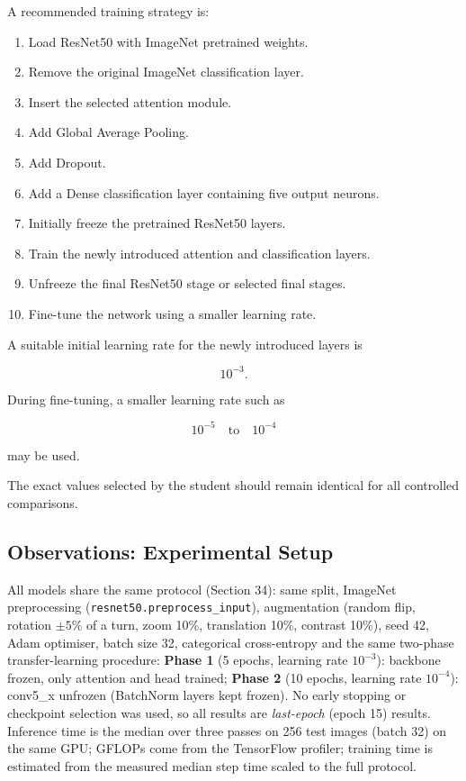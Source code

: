 \documentclass[10pt]{article}
\begin{document}
A recommended training strategy is:

\begin{enumerate}

\item Load ResNet50 with ImageNet pretrained weights.

\item Remove the original ImageNet classification layer.

\item Insert the selected attention module.

\item Add Global Average Pooling.

\item Add Dropout.

\item Add a Dense classification layer containing five output neurons.

\item Initially freeze the pretrained ResNet50 layers.

\item Train the newly introduced attention and classification layers.

\item Unfreeze the final ResNet50 stage or selected final stages.

\item Fine-tune the network using a smaller learning rate.

\end{enumerate}

A suitable initial learning rate for the newly introduced layers is

\[
10^{-3}.
\]

During fine-tuning, a smaller learning rate such as

\[
10^{-5}
\quad\text{to}\quad
10^{-4}
\]

may be used.

The exact values selected by the student should remain identical for all
controlled comparisons.


\subsection*{Observations: Experimental Setup}
All models share the same protocol (Section 34): same split, ImageNet preprocessing (\texttt{resnet50.preprocess\_input}), augmentation (random flip, rotation $\pm5\%$ of a turn, zoom 10\%, translation 10\%, contrast 10\%), seed 42, Adam optimiser, batch size 32, categorical cross-entropy and the same two-phase transfer-learning procedure: \textbf{Phase 1} (5 epochs, learning rate $10^{-3}$): backbone frozen, only attention and head trained; \textbf{Phase 2} (10 epochs, learning rate $10^{-4}$): conv5\_x unfrozen (BatchNorm layers kept frozen). No early stopping or checkpoint selection was used, so all results are \emph{last-epoch} (epoch 15) results. Inference time is the median over three passes on 256 test images (batch 32) on the same GPU; GFLOPs come from the TensorFlow profiler; training time is estimated from the measured median step time scaled to the full protocol.
\end{document}
